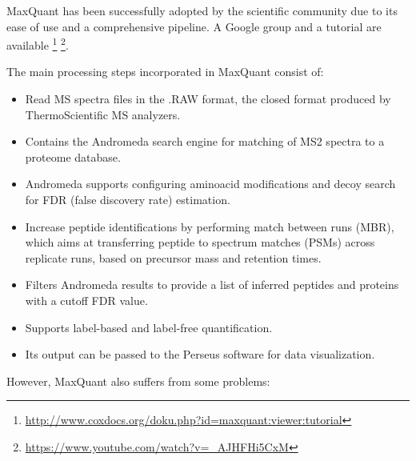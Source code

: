 \documentclass[11pt, a4paper]{report}
\begin{document}
MaxQuant has been successfully adopted by the scientific community due to its ease of use and a comprehensive pipeline. A Google group and a tutorial are available  \footnote{\href{http://www.coxdocs.org/doku.php?id=maxquant:viewer:tutorial}{http://www.coxdocs.org/doku.php?id=maxquant:viewer:tutorial}} \footnote{\href{https://www.youtube.com/watch?v=\_AJHFHi5CxM}{https://www.youtube.com/watch?v=\_AJHFHi5CxM}}.

The main processing steps incorporated in MaxQuant consist of:

\begin{itemize}

\item Read MS spectra files in the .RAW format, the closed format produced by ThermoScientific MS analyzers.

\item Contains the Andromeda search engine \cite{Cox2011} for matching of \ac{MS2} spectra to a proteome database.

\item Andromeda supports configuring aminoacid modifications and decoy search for FDR (false discovery rate) estimation.

\item Increase peptide identifications by performing match between runs (MBR), which aims at transferring peptide to spectrum matches (PSMs) across replicate runs, based on precursor mass and retention times.

\item Filters Andromeda results to provide a list of inferred peptides and proteins with a cutoff FDR value.

\item Supports label-based and label-free quantification.

\item Its output can be passed to the Perseus software for data visualization. %

\end{itemize}

However, MaxQuant also suffers from some problems:
\end{document}
